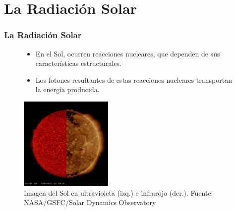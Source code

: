 \documentclass{beamer}
\begin{document}
\section{La Radiación Solar}
\begin{frame}
   \frametitle{La Radiación Solar}
   \begin{figure}[h!]
   \begin{minipage}{0.3\textwidth}
   \begin{flushleft}
   \begin{itemize}
      \item\small En el Sol, ocurren reacciones nucleares, que dependen de sus características estructurales. 
      \item\small Los fotones resultantes de estas reacciones nucleares transportan la energía producida. 
   \end{itemize}
   \end{flushleft} 
   \end{minipage}
   \begin{minipage}{0.5\textwidth}
      \centering \includegraphics[width=4.5cm, height=4.5cm]{radiacion_solar}
      \caption{\tiny Imagen del Sol en ultravioleta (izq.) e infrarojo (der.). Fuente: NASA/GSFC/Solar Dynamics Observatory}
   \end{minipage}
   \end{figure}
\end{frame}
\end{document}
